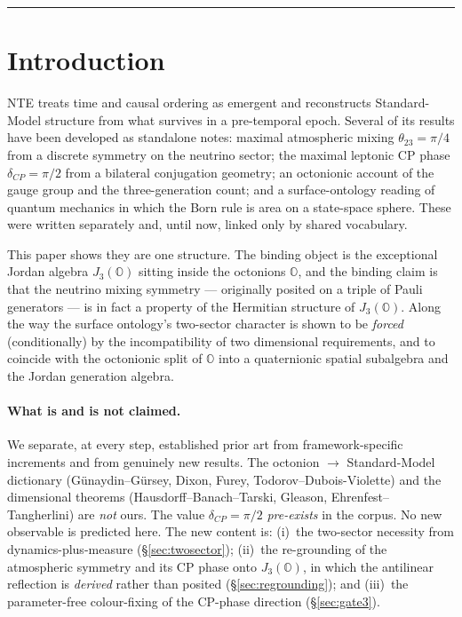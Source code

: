 \documentclass[11pt]{article}
\theoremstyle{definition}
\newcommand{\OO}{\mathbb{O}}
\newcommand{\JthreeO}{J_3(\OO)}
\begin{document}
\tableofcontents
\medskip
\hrule

\section{Introduction}

NTE treats time and causal ordering as emergent and reconstructs Standard-Model structure from what survives in a pre-temporal epoch. Several of its results have been developed as standalone notes: maximal atmospheric mixing $\theta_{23}=\pi/4$ from a discrete symmetry on the neutrino sector; the maximal leptonic CP phase $\delta_{CP}=\pi/2$ from a bilateral conjugation geometry; an octonionic account of the gauge group and the three-generation count; and a surface-ontology reading of quantum mechanics in which the Born rule is area on a state-space sphere. These were written separately and, until now, linked only by shared vocabulary.

This paper shows they are one structure. The binding object is the exceptional Jordan algebra $\JthreeO$ sitting inside the octonions $\OO$, and the binding claim is that the neutrino mixing symmetry --- originally posited on a triple of Pauli generators --- is in fact a property of the Hermitian structure of $\JthreeO$. Along the way the surface ontology's two-sector character is shown to be \emph{forced} (conditionally) by the incompatibility of two dimensional requirements, and to coincide with the octonionic split of $\OO$ into a quaternionic spatial subalgebra and the Jordan generation algebra.

\paragraph{What is and is not claimed.} We separate, at every step, established prior art from framework-specific increments and from genuinely new results. The octonion $\to$ Standard-Model dictionary (G\"unaydin--G\"ursey, Dixon, Furey, Todorov--Dubois-Violette) and the dimensional theorems (Hausdorff--Banach--Tarski, Gleason, Ehrenfest--Tangherlini) are \emph{not} ours. The value $\delta_{CP}=\pi/2$ \emph{pre-exists} in the corpus. No new observable is predicted here. The new content is: (i)~the two-sector necessity from dynamics-plus-measure (\S\ref{sec:twosector}); (ii)~the re-grounding of the atmospheric symmetry and its CP phase onto $\JthreeO$, in which the antilinear reflection is \emph{derived} rather than posited (\S\ref{sec:regrounding}); and (iii)~the parameter-free colour-fixing of the CP-phase direction (\S\ref{sec:gate3}).
\end{document}
